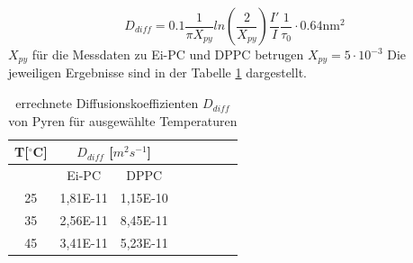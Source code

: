 \begin{equation}\label{formel4}
D_{diff}=0.1\frac{1}{\pi X_{py}}ln\left(\frac{2}{X_{py}}\right)\frac{I'}{I}\frac{1}{\tau_0}\cdot0.64\text{nm}^2
\end{equation}
$X_{py}$ für die Messdaten zu Ei-PC und DPPC betrugen $X_{py}=5\cdot 10^{-3}$ 
Die jeweiligen Ergebnisse sind in der Tabelle \ref{tab:meinetabelle} dargestellt.

 \begin{table} [h]
	\footnotesize
	\begin{center}
		\caption{errechnete Diffusionskoeffizienten $D_{diff}$ von Pyren für ausgewählte Temperaturen}
		\begin{tabular} {c c c l l l l l}
			T[$^\circ$C]&  \multicolumn{2}{c}{$D_{diff}$ [$m^2s^{-1}$]} & \\ \hline
			&	Ei-PC&	DPPC \\ \hline 
			25&	1,81E-11&	1,15E-10\\ \hline 
			35&	2,56E-11&	8,45E-11\\ \hline 
			45&	3,41E-11&	5,23E-11\\ \hline 
		\end{tabular}
		\label{tab:meinetabelle}
	\end{center}
\end{table}


\newpage
